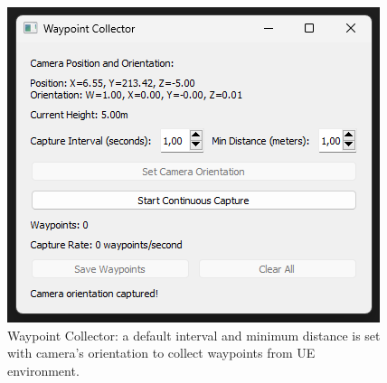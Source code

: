 \documentclass[../report.tex]{subfiles}
\begin{document}
    \begin{figure}[ht]
        \centering
        \includegraphics[width=0.9\linewidth]{figures/waypoint_collector.png}
        \caption{Waypoint Collector: a default interval and minimum distance is set with camera's orientation to collect waypoints from UE environment.}
        \label{fig:waypoint_collector}
    \end{figure}
    
\end{document}
